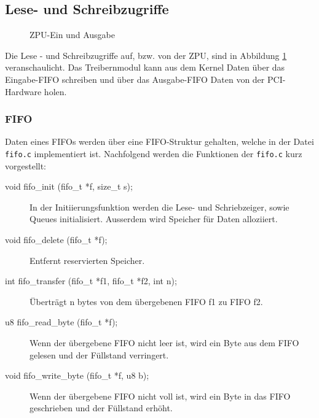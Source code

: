 \documentclass[11pt]{scrartcl}
\begin{document}
\subsection{Lese- und Schreibzugriffe}

\begin{figure}[H]
	\begin{center}
		
		\caption{ZPU-Ein und Ausgabe}
		\label{zpu_io}
	\end{center}
\end{figure}

Die Lese - und Schreibzugriffe auf, bzw. von der ZPU, sind in Abbildung \ref{zpu_io} veranschaulicht. Das Treibernmodul kann aus dem Kernel Daten über das Eingabe-FIFO schreiben und über das Ausgabe-FIFO Daten von der PCI-Hardware holen.

\subsubsection{FIFO}

Daten eines FIFOs werden über eine FIFO-Struktur gehalten, welche in der Datei \texttt{fifo.c} implementiert ist. Nachfolgend werden die Funktionen der \texttt{fifo.c} kurz vorgestellt:

\begin{description}
    \item[void fifo\_init       (fifo\_t *f, size\_t s);]
    In der Initiierungsfunktion werden die Lese- und Schriebzeiger, sowie Queues initialisiert. Ausserdem wird Speicher für Daten alloziiert. 
    
    \item[void fifo\_delete     (fifo\_t *f);]
    Entfernt reservierten Speicher. 
    
    \item[int  fifo\_transfer   (fifo\_t *f1, fifo\_t *f2, int n);]
    Überträgt n bytes von dem übergebenen FIFO f1 zu FIFO f2.
    
    \item[u8   fifo\_read\_byte  (fifo\_t *f);]
    Wenn der übergebene FIFO nicht leer ist, wird ein Byte aus dem FIFO gelesen und der Füllstand verringert. 
    
    \item[void fifo\_write\_byte (fifo\_t *f, u8 b);]
    Wenn der übergebene FIFO nicht voll ist, wird ein Byte in das FIFO geschrieben und der Füllstand erhöht.
\end{description}
\end{document}
